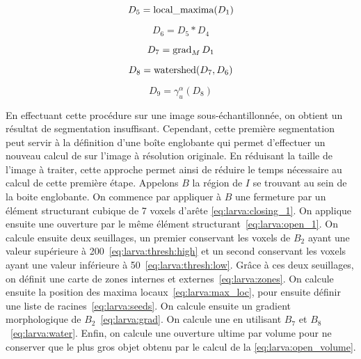 \documentclass[\main/main.tex]{subfiles}
\begin{document}
\begin{equation}
    \label{eq:larva:down:max_loc}
    D_{5} = \operatorname{\textnormal{local\_maxima}}(D_1) \\
\end{equation}

\begin{equation}
    \label{eq:larva:down:seeds}
    D_{6}= D_{5} * D_{4}
\end{equation}

\begin{equation}
    \label{eq:larva:down:grad}
    D_{7}= \operatorname{\textnormal{grad}}_M{D_1}
\end{equation}

\begin{equation}
    \label{eq:larva:down:water}
    D_{8}= \operatorname{\textnormal{watershed}}(D_{7},D_{6})
\end{equation}

\begin{equation}
    \label{eq:larva:down:ultime}
    D_{9}= \gamma^{\alpha}_{u}(D_8)
\end{equation}

En effectuant cette procédure sur une image sous-échantillonnée, on obtient un résultat de segmentation insuffisant.
%
Cependant, cette première segmentation peut servir à la définition d'une boîte englobante qui permet d'effectuer un nouveau calcul de \watershed{} sur l'image à résolution originale.
%
En réduisant la taille de l'image à traiter, cette approche permet ainsi de réduire le temps nécessaire au calcul de cette première étape.
%
Appelons $B$ la région de $I$ se trouvant au sein de la boite englobante.
%
On commence par appliquer à $B$ une fermeture par un élément structurant cubique de 7 voxels d'arête \eqref{eq:larva:closing_1}.
%
On applique ensuite une ouverture par le même élément structurant~\eqref{eq:larva:open_1}.
%
On calcule ensuite deux seuillages, un premier conservant les voxels de $B_2$ ayant une valeur supérieure à 200~\eqref{eq:larva:thresh:high} et un second conservant les voxels ayant une valeur inférieure à 50~\eqref{eq:larva:thresh:low}.
%
Grâce à ces deux seuillages, on définit une carte de zones internes et externes~\eqref{eq:larva:zones}.
%
On calcule ensuite la position des maxima locaux~\eqref{eq:larva:max_loc}, pour ensuite définir une liste de racines~\eqref{eq:larva:seeds}.
%
On calcule ensuite un gradient morphologique de $B_2$~\eqref{eq:larva:grad}.
%
On calcule une \watershed{} en utilisant $B_7$ et $B_8$~\eqref{eq:larva:water}.
%
Enfin, on calcule une ouverture ultime par volume pour ne conserver que le plus gros objet obtenu par le calcul de la \watershed{} \eqref{eq:larva:open_volume}.
\end{document}
